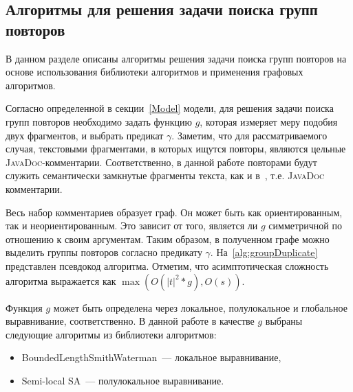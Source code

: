 



\subsection{Алгоритмы для решения задачи поиска групп повторов}\label{grouppa}
В данном разделе описаны алгоритмы решения задачи поиска групп повторов на основе использования библиотеки алгоритмов и применения графовых алгоритмов.

Согласно определенной в секции~\ref{Model} модели, для решения задачи поиска групп повторов необходимо
задать функцию $g$, которая измеряет меру подобия двух фрагментов, и выбрать предикат $\gamma$.
Заметим, что для рассматриваемого случая, текстовыми фрагментами, в которых ищутся повторы, являются цельные \textsc{JavaDoc}-комментарии.
Соответственно, в данной работе повторами будут служить семантически замкнутые фрагменты текста, как и в~\cite{soto2015similarity}, т.е. \textsc{JavaDoc} комментарии.

Весь набор комментариев образует граф.
Он может быть как ориентированным, так и неориентированным.
Это зависит  от того, является ли $g$ симметричной по отношению к своим аргументам.
Таким образом, в полученном графе можно выделить группы повторов согласно предикату $\gamma$.
На~\ref{alg:groupDuplicate} представлен псевдокод алгоритма.
Отметим, что асимптотическая сложность алгоритма выражается как $\max (O(|t|^2*g), O(s))$.

Функция $g$ может быть определена через локальное, полулокальное и глобальное выравнивание, соответственно.
В данной работе в качестве $g$ выбраны следующие алгоритмы из библиотеки алгоритмов:
\begin{itemize}
    \item BoundedLengthSmithWaterman~--- локальное выравнивание,
    \item Semi-local SA~--- полулокальное выравнивание.
\end{itemize}

